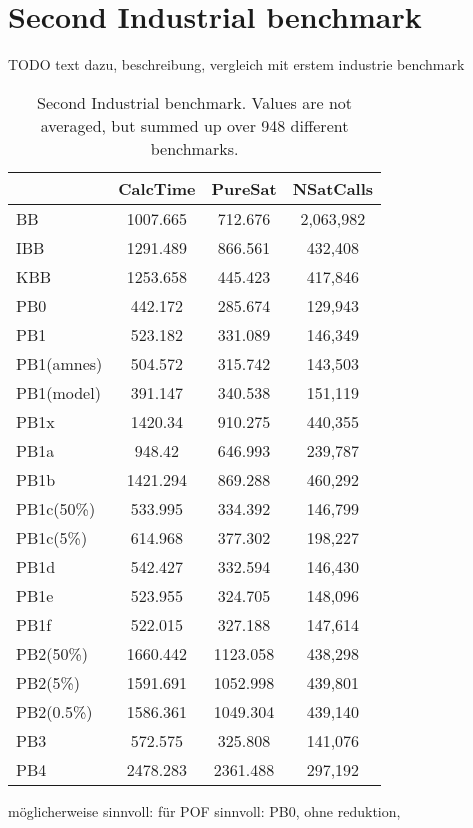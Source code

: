 \section{Second Industrial benchmark}

TODO text dazu, beschreibung, vergleich mit erstem industrie benchmark

\begin{wraptable}{R}{8cm}
\begin{tabular}{l| c c c }

 & CalcTime & PureSat & NSatCalls \\
 \hline
BB & 1007.665 & 712.676 & 2,063,982 \\
IBB & 1291.489 & 866.561 & 432,408 \\
KBB & 1253.658 & 445.423 & 417,846 \\
PB0 & 442.172 & 285.674 & 129,943 \\
PB1 & 523.182 & 331.089 & 146,349 \\
PB1(amnes) & 504.572 & 315.742 & 143,503 \\
PB1(model) & 391.147 & 340.538 & 151,119 \\
PB1x & 1420.34 & 910.275 & 440,355 \\
PB1a & 948.42 & 646.993 & 239,787 \\
PB1b & 1421.294 & 869.288 & 460,292 \\
PB1c(50\%) & 533.995 & 334.392 & 146,799 \\
PB1c(5\%) & 614.968 & 377.302 & 198,227 \\
PB1d & 542.427 & 332.594 & 146,430 \\
PB1e & 523.955 & 324.705 & 148,096 \\
PB1f & 522.015 & 327.188 & 147,614 \\
PB2(50\%) & 1660.442 & 1123.058 & 438,298 \\
PB2(5\%) & 1591.691 & 1052.998 & 439,801 \\
PB2(0.5\%) & 1586.361 & 1049.304 & 439,140 \\
PB3 & 572.575 & 325.808 & 141,076 \\
PB4 & 2478.283 & 2361.488 & 297,192 \\

\end{tabular}
\caption{Second Industrial benchmark. Values are not averaged, but summed up over 948 different benchmarks.}
\label{tab:vonThore2pof} %
\end{wraptable}

möglicherweise sinnvoll: für POF sinnvoll: PB0, ohne reduktion, 

